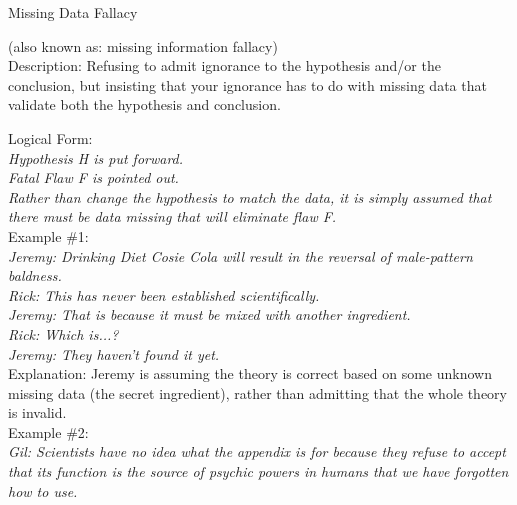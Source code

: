 \documentclass[a4paper,12pt,single,pdftex]{scrartcl}
\begin{document}
Missing Data Fallacy
    
      (also known as: missing information fallacy)
    \\

  
    Description: Refusing to admit ignorance to the hypothesis and/or the conclusion, but insisting that your ignorance has to do with missing data that validate both the hypothesis and conclusion.

    
      Logical Form:
    \\

    
      {\em Hypothesis H is put forward.}
    \\

    
      {\em Fatal Flaw F is pointed out.}
    \\

    
      {\em Rather than change the hypothesis to match the data, it is simply assumed that there must be data missing that will eliminate flaw F.}
    \\

    
      Example \#1: 
    \\

    
      {\em Jeremy: Drinking Diet Cosie Cola will result in the reversal of male-pattern baldness.}
    \\

    
      {\em Rick: This has never been established scientifically.}
    \\

    
      {\em Jeremy: That is because it must be mixed with another ingredient.}
    \\

    
      {\em Rick: Which is...?}
    \\

    
      {\em Jeremy: They haven’t found it yet.}
    \\

    
      Explanation: Jeremy is assuming the theory is correct based on some unknown missing data (the secret ingredient), rather than admitting that the whole theory is invalid.
    \\

    
      Example \#2: 
    \\

    
      {\em Gil: Scientists have no idea what the appendix is for because they refuse to accept that its function is the source of psychic powers in humans that we have forgotten how to use.}
    \\
\end{document}
